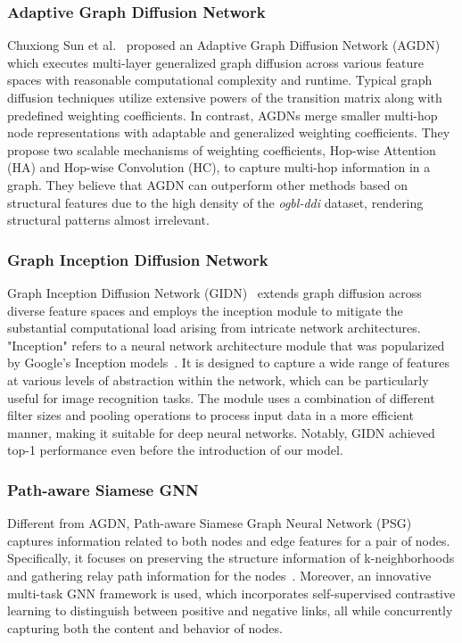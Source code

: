 \documentclass[11pt]{article}
\begin{document}
\subsubsection{Adaptive Graph Diffusion Network}
Chuxiong Sun et al.~\cite{sun2020adaptive} proposed an Adaptive Graph Diffusion Network (AGDN) which executes multi-layer generalized graph diffusion across various feature spaces with reasonable computational complexity and runtime. Typical graph diffusion techniques utilize extensive powers of the transition matrix along with predefined weighting coefficients. In contrast, AGDNs merge smaller multi-hop node representations with adaptable and generalized weighting coefficients. They propose two scalable mechanisms of weighting coefficients, Hop-wise Attention (HA) and Hop-wise Convolution (HC), to capture multi-hop information in a graph. They believe that AGDN can outperform other methods based on structural features due to the high density of the \textit{ogbl-ddi} dataset, rendering structural patterns almost irrelevant. 

\subsubsection{Graph Inception Diffusion Network}
Graph Inception Diffusion Network (GIDN)~\cite{wang2022gidn} extends graph diffusion across diverse feature spaces and employs the inception module to mitigate the substantial computational load arising from intricate network architectures. "Inception" refers to a neural network architecture module that was popularized by Google's Inception models~\cite{szegedy2015going}. It is designed to capture a wide range of features at various levels of abstraction within the network, which can be particularly useful for image recognition tasks. The module uses a combination of different filter sizes and pooling operations to process input data in a more efficient manner, making it suitable for deep neural networks. Notably, GIDN achieved top-1 performance even before the introduction of our model. 

\subsubsection{Path-aware Siamese GNN}
Different from AGDN, Path-aware Siamese Graph Neural Network (PSG) captures information related to both nodes and edge features for a pair of nodes. Specifically, it focuses on preserving the structure information of k-neighborhoods and gathering relay path information for the nodes~\cite{lv2022path}. Moreover, an innovative multi-task GNN framework is used, which incorporates self-supervised contrastive learning to distinguish between positive and negative links, all while concurrently capturing both the content and behavior of nodes. 
\end{document}
